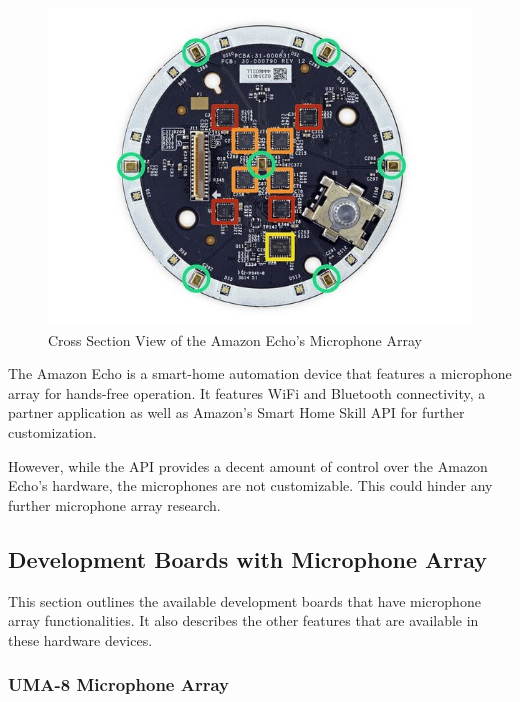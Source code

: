 \documentclass[hidelinks,12pt]{report} %
\begin{document}
\begin{figure}[h]
\centering
\includegraphics[scale = 0.5]{fig2.5} 
\caption{Cross Section View of the Amazon Echo's Microphone Array}
\label{fig}
\end{figure}

The Amazon Echo is a smart-home automation device that features a microphone array for hands-free operation. It features WiFi and Bluetooth connectivity, a partner application as well as Amazon’s Smart Home Skill API for further customization. 

However, while the API provides a decent amount of control over the Amazon Echo’s hardware, the microphones are not customizable. This could hinder any further microphone array research\cite{21}.

\subsection{Development Boards with Microphone Array}

This section outlines the available development boards that have microphone array functionalities. It also describes the other features that are available in these hardware devices.

\subsubsection{UMA-8 Microphone Array}
\end{document}
